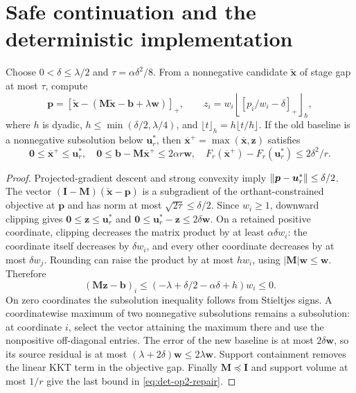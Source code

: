 \section{Safe continuation and the deterministic implementation}
\label{sec:det-op2-continuation}

\begin{lemma}
\label{lem:det-op2-repair}
Choose $0<\delta\leq\lambda/2$ and $\tau=\alpha\delta^2/8$.
From a nonnegative candidate $\widetilde{\bm{x}}$ of stage gap at most
$\tau$, compute
\[
 \bm{p}=[\widetilde{\bm{x}}-(\bm{M}\widetilde{\bm{x}}
                  -\bm{b}+\lambda\bm{w})]_+,
 \qquad
 z_i=w_i\left\lfloor[p_i/w_i-\delta]_+\right\rfloor_h,
\]
where $h$ is dyadic, $h\leq\min(\delta/2,\lambda/4)$, and
$\lfloor t\rfloor_h=h\lfloor t/h\rfloor$.
If the old baseline is a nonnegative subsolution below $\bm{u}_r^*$,
then $\overline{\bm{x}}^+=\max(\overline{\bm{x}},\bm{z})$ satisfies
\begin{equation}\label{eq:det-op2-repair}
 \bm{0}\leq\overline{\bm{x}}^+\leq\bm{u}_r^*,\quad
 \bm{0}\leq\bm{b}-\bm{M}\overline{\bm{x}}^+\leq2\alpha r\bm{w},\quad
 F_r(\overline{\bm{x}}^+)-F_r(\bm{u}_r^*)\leq2\delta^2/r.
\end{equation}
\end{lemma}
\begin{proof}
Projected-gradient descent and strong convexity imply
$\lVert\bm{p}-\bm{u}_r^*\rVert\leq\delta/2$.
The vector $(\bm{I}-\bm{M})(\widetilde{\bm{x}}-\bm{p})$ is a
subgradient of the orthant-constrained objective at $\bm{p}$ and has norm
at most $\sqrt{2\tau}\leq\delta/2$.
Since $w_i\geq1$, downward clipping gives
$\bm{0}\leq\bm{z}\leq\bm{u}_r^*$ and
$\bm{0}\leq\bm{u}_r^*-\bm{z}\leq2\delta\bm{w}$.
On a retained positive coordinate, clipping decreases the matrix product
by at least $\alpha\delta w_i$: the coordinate itself decreases by
$\delta w_i$, and every other coordinate decreases by at most
$\delta w_j$. Rounding can raise the product by at most $hw_i$,
using $|\bm{M}|\bm{w}\leq\bm{w}$. Therefore
\[
 (\bm{M}\bm{z}-\bm{b})_i
 \leq(-\lambda+\delta/2-\alpha\delta+h)w_i\leq0.
\]
On zero coordinates the subsolution inequality follows from Stieltjes
signs. A coordinatewise maximum of two nonnegative subsolutions remains
a subsolution: at coordinate $i$, select the vector attaining the maximum
there and use the nonpositive off-diagonal entries.
The error of the new baseline is at most $2\delta\bm{w}$, so its source
residual is at most $(\lambda+2\delta)\bm{w}\leq2\lambda\bm{w}$.
Support containment removes the linear KKT term in the objective gap.
Finally $\bm{M}\preceq\bm{I}$ and support volume at most $1/r$ give
the last bound in \eqref{eq:det-op2-repair}.
\end{proof}

